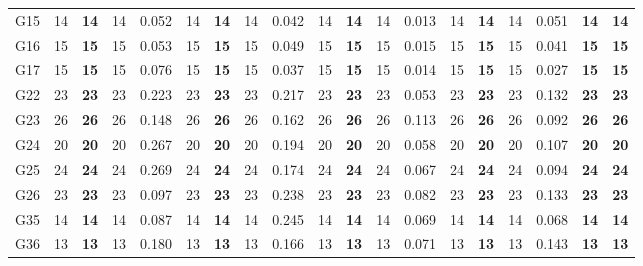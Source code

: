 \documentclass[12pt, a4paper]{article}%
\numberwithin{equation}{section}
\theoremstyle{plain}
\begin{document}
{\begin{landscape}
\begin{longtable}{lllllllllllllllllll}
						G15                       & 14   & \textbf{14} & 14  & 0.052 & 14   & \textbf{14} & 14  & 0.042 & 14   & \textbf{14} & 14  & 0.013 & 14   & \textbf{14} & 14  & 0.051 & \textbf{14}             & \textbf{14}          \\
						G16                       & 15   & \textbf{15} & 15  & 0.053 & 15   & \textbf{15} & 15  & 0.049 & 15   & \textbf{15} & 15  & 0.015 & 15   & \textbf{15} & 15  & 0.041 & \textbf{15}             & \textbf{15}          \\
						G17                       & 15   & \textbf{15} & 15  & 0.076 & 15   & \textbf{15} & 15  & 0.037 & 15   & \textbf{15} & 15  & 0.014 & 15   & \textbf{15} & 15  & 0.027 & \textbf{15}             & \textbf{15}          \\
						G22                       & 23   & \textbf{23} & 23  & 0.223 & 23   & \textbf{23} & 23  & 0.217 & 23   & \textbf{23} & 23  & 0.053 & 23   & \textbf{23} & 23  & 0.132 & \textbf{23}             & \textbf{23}          \\
						G23                       & 26   & \textbf{26} & 26  & 0.148 & 26   & \textbf{26} & 26  & 0.162 & 26   & \textbf{26} & 26  & 0.113 & 26   & \textbf{26} & 26  & 0.092 & \textbf{26}             & \textbf{26}          \\
						G24                       & 20   & \textbf{20} & 20  & 0.267 & 20   & \textbf{20} & 20  & 0.194 & 20   & \textbf{20} & 20  & 0.058 & 20   & \textbf{20} & 20  & 0.107 & \textbf{20}             & \textbf{20}          \\
						G25                       & 24   & \textbf{24} & 24  & 0.269 & 24   & \textbf{24} & 24  & 0.174 & 24   & \textbf{24} & 24  & 0.067 & 24   & \textbf{24} & 24  & 0.094 & \textbf{24}             & \textbf{24}          \\
						G26                       & 23   & \textbf{23} & 23  & 0.097 & 23   & \textbf{23} & 23  & 0.238 & 23   & \textbf{23} & 23  & 0.082 & 23   & \textbf{23} & 23  & 0.133 & \textbf{23}             & \textbf{23}          \\
						G35                       & 14   & \textbf{14} & 14  & 0.087 & 14   & \textbf{14} & 14  & 0.245 & 14   & \textbf{14} & 14  & 0.069 & 14   & \textbf{14} & 14  & 0.068 & \textbf{14}             & \textbf{14}          \\
						G36                       & 13   & \textbf{13} & 13  & 0.180 & 13   & \textbf{13} & 13  & 0.166 & 13   & \textbf{13} & 13  & 0.071 & 13   & \textbf{13} & 13  & 0.143 & \textbf{13}             & \textbf{13}          \\

\end{longtable}
\end{landscape}}
\end{document}
